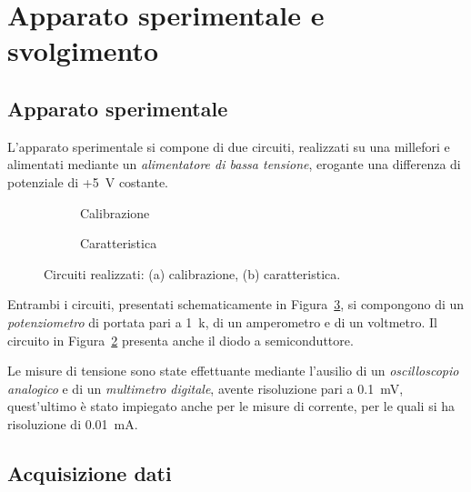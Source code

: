 \documentclass[@MAIN@]{subfiles}
\begin{document}
    \section{Apparato sperimentale e svolgimento} \label{sec:acquisizione}

    \subsection{Apparato sperimentale}\label{subsec:apparato-sperimentale}
    L'apparato sperimentale si compone di due circuiti, realizzati su una millefori
    e alimentati mediante un \textit{alimentatore di bassa tensione},
    erogante una differenza di potenziale di +5~V costante.
\vspace{0.5cm}

    \begin{figure}[ht]
        \centering
        \begin{subfigure}[b]{0.4\textwidth}
            \centering
            
            \caption{Calibrazione}
            \label{fig:circuito-calibrazione}
        \end{subfigure}
        \hfill
        \begin{subfigure}[b]{0.55\textwidth}
            \centering
            
            \caption{Caratteristica}
            \label{fig:circuito-caratteristica}
        \end{subfigure}
        \caption{Circuiti realizzati: (a) calibrazione, (b) caratteristica.}
        \label{fig:figura_circuiti}
    \end{figure}

    \newpage
    Entrambi i circuiti, presentati schematicamente in Figura~\ref{fig:figura_circuiti}, si compongono di
    un \textit{potenziometro} di portata pari a 1~k\textohm, di un amperometro e
    di un voltmetro.
    Il circuito in Figura~\ref{fig:circuito-caratteristica} presenta anche il diodo
    a semiconduttore.

    Le misure di tensione sono state effettuante mediante l'ausilio di un
    \textit{oscilloscopio analogico} e di un \textit{multimetro digitale}, avente
    risoluzione pari a 0.1~mV, quest'ultimo è stato impiegato anche per le misure
    di corrente, per le quali si ha risoluzione di 0.01~mA.
    \vspace{0.2cm}

    \subsection{Acquisizione dati}\label{subsec:acquisizione-dati}
\end{document}
